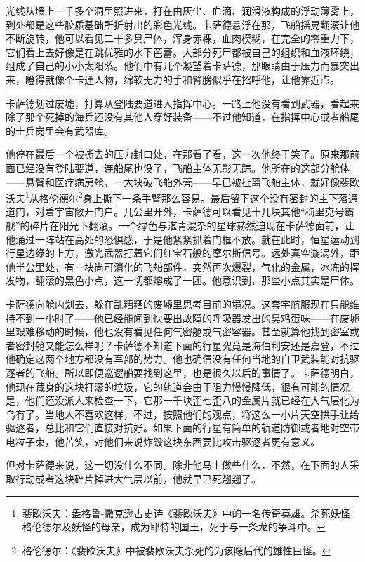 \documentclass[AutoFakeBold=true]{book}
\begin{document}
光线从墙上一千多个洞里照进来，打在由灰尘、血滴、润滑液构成的浮动薄雾上，到处都是这些胶质基础所折射出的彩色光线。卡萨德悬浮在那，飞船摇晃翻滚让他不断旋转，他可以看见二十多具尸体，浑身赤裸，血肉模糊，在完全的零重力下，它们看上去好像是在跳优雅的水下芭蕾。大部分死尸都被自己的组织和血液环绕，组成了自己的小小太阳系。他们中有几个凝望着卡萨德，那眼睛由于压力而暴突出来，瞪得就像个卡通人物，绵软无力的手和臂膀似乎在招呼他，让他靠近点。

卡萨德划过废墟，打算从登陆要道进入指挥中心。一路上他没有看到武器，看起来除了那个死掉的海兵还没有其他人穿好装备——不过他知道，在指挥中心或者船尾的士兵岗里会有武器库。

他停在最后一个被撕去的压力封口处，在那看了看，这一次他终于笑了。原来那前面已经没有登陆要道，连船尾也没了，飞船主体无影无踪。他所在的这部分舱体——悬臂和医疗病房舱，一大块破飞船外壳——早已被扯离飞船主体，就好像裴欧沃夫\footnote{裴欧沃夫：盎格鲁-撒克逊古史诗《裴欧沃夫》中的一名传奇英雄。杀死妖怪格伦德尔及妖怪的母亲，成为耶特的国王，死于与一条龙的争斗中。}从格伦德尔\footnote{格伦德尔：《裴欧沃夫》中被裴欧沃夫杀死的为该隐后代的雄性巨怪。}身上撕下一条手臂那么容易。最后留下这个没有密封的主下落通道门，对着宇宙敞开门户。几公里开外，卡萨德可以看见十几块其他``梅里克号霸舰''的碎片在阳光下翻滚。一个绿色与湛青混杂的星球赫然迫现在卡萨德面前，让他涌过一阵站在高处的恐惧感，于是他紧紧抓着门框不放。就在此时，恒星运动到行星边缘的上方，激光武器打着它们红宝石般的摩尔斯信号。远处真空漩涡外，距他半公里处，有一块尚可消化的飞船部件，突然再次爆裂，气化的金属，冰冻的挥发物，翻滚的黑色小点，这一切都熔成了一团。他意识到，那些小点其实是尸体。

卡萨德向舱内划去，躲在乱糟糟的废墟里思考目前的境况。这套宇航服现在只能维持不到一小时了——他已经能闻到快要出故障的呼吸器发出的臭鸡蛋味——在废墟里艰难移动的时候，他也没有看见任何气密舱或气密容器。甚至就算他找到密室或者密封舱又能怎么样呢？卡萨德不知道下面的行星究竟是海伯利安还是嘉登，不过他确定这两个地方都没有军部的势力。他也确信没有任何当地的自卫武装能对抗驱逐者的飞船。所以即便巡逻船要找到这里，也是很久以后的事情了。卡萨德明白，他现在藏身的这块打滚的垃圾，它的轨道会由于阻力慢慢降低，很有可能的情况是，他们还没派人来检查一下，它那一千块歪七歪八的金属片就已经在大气层化为乌有了。当地人不喜欢这样，不过，按照他们的观点，将这么一小片天空拱手让给驱逐者，总比和它们直接对抗好。如果下面的行星有简单的轨道防御或者地对空带电粒子束，他苦笑，对他们来说炸毁这块东西要比攻击驱逐者更有意义。

但对卡萨德来说，这一切没什么不同。除非他马上做些什么，不然，在下面的人采取行动或者这块碎片掉进大气层以前，他就早已死翘翘了。
\end{document}

